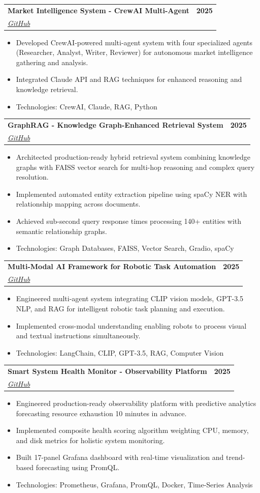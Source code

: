 \documentclass[a4paper,11pt]{article}
\makeatletter
\newcommand{\resumeItem}[1]{
  \item\small{
    {#1 \vspace{-2pt}}
  }
}
\newcommand{\resumeSubheading}[4]{
  \vspace{-2pt}\item
    \begin{tabular*}{1.0\textwidth}[t]{l@{\extracolsep{\fill}}r}
      \textbf{#1} & \textbf{\small #2} \\
      \textit{\small#3} & \textit{\small #4} \\
    \end{tabular*}\vspace{-7pt}
}
\newcommand{\resumeItemListStart}{\begin{itemize}}
\newcommand{\resumeItemListEnd}{\end{itemize}\vspace{-5pt}}
\makeatother
\begin{document}
\resumeSubheading
{Market Intelligence System - CrewAI Multi-Agent}{2025}
{\href{https://github.com/thiyanayugi/Autonomous-Market-Intelligence-System-Using-Multi-Agent-AI-CrewAI-}{GitHub}}{}
\vspace{-18pt}
\resumeItemListStart
  \resumeItem{Developed CrewAI-powered multi-agent system with four specialized agents (Researcher, Analyst, Writer, Reviewer) for autonomous market intelligence gathering and analysis.}
  \resumeItem{Integrated Claude API and RAG techniques for enhanced reasoning and knowledge retrieval.}
  \resumeItem{Technologies: CrewAI, Claude, RAG, Python}
\resumeItemListEnd

\resumeSubheading
{GraphRAG - Knowledge Graph-Enhanced Retrieval System}{2025}
{\href{https://github.com/thiyanayugi/Knowledge-Graph-Enhanced-Retrieval-Augmented-Generation}{GitHub}}{}
\vspace{-18pt}
\resumeItemListStart
  \resumeItem{Architected production-ready hybrid retrieval system combining knowledge graphs with FAISS vector search for multi-hop reasoning and complex query resolution.}
  \resumeItem{Implemented automated entity extraction pipeline using spaCy NER with relationship mapping across documents.}
  \resumeItem{Achieved sub-second query response times processing 140+ entities with semantic relationship graphs.}
  \resumeItem{Technologies: Graph Databases, FAISS, Vector Search, Gradio, spaCy}
\resumeItemListEnd

\resumeSubheading
{Multi-Modal AI Framework for Robotic Task Automation}{2025}
{\href{https://github.com/thiyanayugi/Multi-Modal-AI-Framework-for-Robotic-Task-Automation}{GitHub}}{}
\vspace{-18pt}
\resumeItemListStart
  \resumeItem{Engineered multi-agent system integrating CLIP vision models, GPT-3.5 NLP, and RAG for intelligent robotic task planning and execution.}
  \resumeItem{Implemented cross-modal understanding enabling robots to process visual and textual instructions simultaneously.}
  \resumeItem{Technologies: LangChain, CLIP, GPT-3.5, RAG, Computer Vision}
\resumeItemListEnd

\resumeSubheading
{Smart System Health Monitor - Observability Platform}{2025}
{\href{https://github.com/thiyanayugi/smart-system-health-monitor}{GitHub}}{}
\vspace{-18pt}
\resumeItemListStart
  \resumeItem{Engineered production-ready observability platform with predictive analytics forecasting resource exhaustion 10 minutes in advance.}
  \resumeItem{Implemented composite health scoring algorithm weighting CPU, memory, and disk metrics for holistic system monitoring.}
  \resumeItem{Built 17-panel Grafana dashboard with real-time visualization and trend-based forecasting using PromQL.}
  \resumeItem{Technologies: Prometheus, Grafana, PromQL, Docker, Time-Series Analysis}
\resumeItemListEnd
\end{document}
